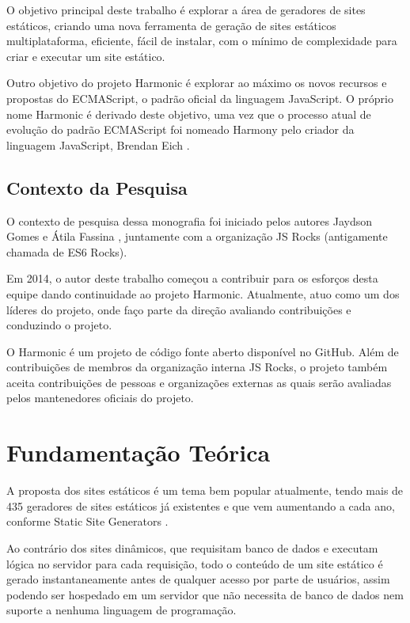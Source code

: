 \documentclass[ppginf, pep]{esinucpel}
\begin{document}
O objetivo principal deste trabalho é explorar a área de geradores de sites estáticos, criando uma nova ferramenta de geração de sites estáticos multiplataforma, eficiente, fácil de instalar, com o mínimo de complexidade para criar e executar um site estático.

Outro objetivo do projeto Harmonic é explorar ao máximo os novos recursos e propostas do ECMAScript, o padrão oficial da linguagem JavaScript. O próprio nome Harmonic é derivado deste objetivo, uma vez que o processo atual de evolução do padrão ECMAScript foi nomeado Harmony pelo criador da linguagem JavaScript, Brendan Eich \cite{harmony}.

\section{Contexto da Pesquisa}

O contexto de pesquisa dessa monografia foi iniciado pelos autores Jaydson Gomes \cite{jaydson} e Átila Fassina \cite{atila}, juntamente com a organização JS Rocks \cite{jsrocks} (antigamente chamada de ES6 Rocks).

Em 2014, o autor deste trabalho começou a contribuir para os esforços desta equipe dando continuidade ao projeto Harmonic. Atualmente, atuo como um dos líderes do projeto, onde faço parte da direção avaliando contribuições e conduzindo o projeto.

O Harmonic é um projeto de código fonte aberto disponível no GitHub. Além de contribuições de membros da organização interna JS Rocks, o projeto também aceita contribuições de pessoas e organizações externas as quais serão avaliadas pelos mantenedores oficiais do projeto.

\chapter{Fundamentação Teórica}

A proposta dos sites estáticos é um tema bem popular atualmente, tendo mais de 435 geradores de sites estáticos já existentes e que vem aumentando a cada ano, conforme Static Site Generators \cite{staticsitegenerators}.

Ao contrário dos sites dinâmicos, que requisitam banco de dados e executam lógica no servidor para cada requisição, todo o conteúdo de um site estático é gerado instantaneamente antes de qualquer acesso por parte de usuários, assim podendo ser hospedado em um servidor que não necessita de banco de dados nem suporte a nenhuma linguagem de programação.
\end{document}
